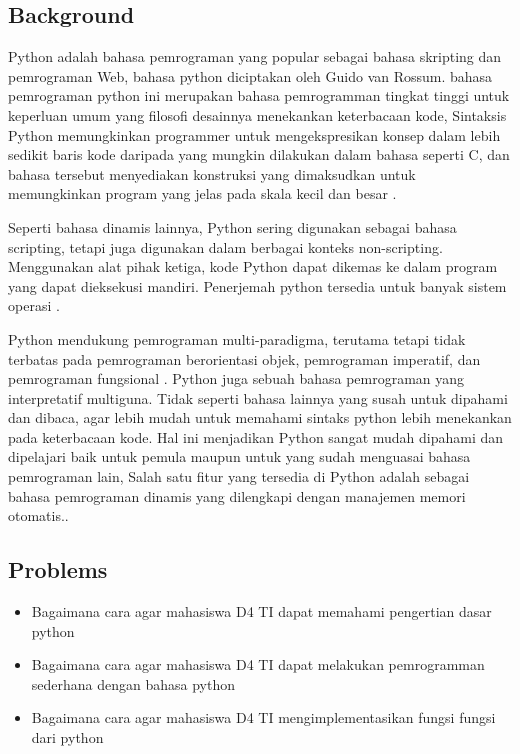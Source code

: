\subsection{Background}
	Python adalah bahasa pemrograman yang popular sebagai bahasa skripting dan pemrograman Web, bahasa python diciptakan oleh Guido van Rossum.
	bahasa pemrograman python ini merupakan bahasa pemrogramman tingkat tinggi untuk keperluan umum yang filosofi desainnya menekankan keterbacaan kode, 
	Sintaksis Python memungkinkan programmer untuk mengekspresikan konsep dalam lebih sedikit baris kode daripada yang mungkin dilakukan dalam bahasa seperti C, 
	dan bahasa tersebut menyediakan konstruksi yang dimaksudkan untuk memungkinkan program yang jelas pada skala kecil dan besar \cite{perkasa2014rancang}.
	\par
	Seperti bahasa dinamis lainnya, Python sering digunakan sebagai bahasa scripting, tetapi juga digunakan dalam berbagai konteks non-scripting. 
	Menggunakan alat pihak ketiga, kode Python dapat dikemas ke dalam program yang dapat dieksekusi mandiri. Penerjemah python tersedia untuk banyak sistem operasi \cite{zein2018pendeteksian}. 
	\par 
	Python mendukung pemrograman multi-paradigma, terutama tetapi tidak terbatas pada pemrograman berorientasi objek, pemrograman imperatif, dan pemrograman fungsional \cite{zikri2018prediksi}. 
	Python juga sebuah bahasa pemrograman yang interpretatif multiguna. Tidak seperti bahasa lainnya yang susah untuk dipahami dan dibaca, agar lebih mudah untuk memahami sintaks python lebih menekankan pada keterbacaan kode. 
	Hal ini menjadikan Python sangat mudah dipahami dan dipelajari baik untuk pemula maupun untuk yang sudah menguasai bahasa pemrograman lain,
	Salah satu fitur yang tersedia di Python adalah sebagai bahasa pemrograman dinamis yang dilengkapi dengan manajemen memori otomatis..
	
\subsection{Problems}
	\begin{itemize}
	\item Bagaimana cara agar mahasiswa D4 TI dapat memahami pengertian dasar python
    \item Bagaimana cara agar mahasiswa D4 TI dapat melakukan pemrogramman sederhana dengan bahasa python
    \item Bagaimana cara agar mahasiswa D4 TI mengimplementasikan fungsi fungsi dari python
	\end{itemize}
	

